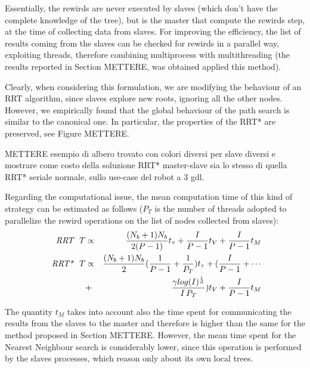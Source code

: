 Essentially, the rewirds are never executed by slaves (which don't have the complete knowledge of the tree), but is the master that compute the rewirds step, at the time of collecting data from slaves. For improving the efficiency, the list of results coming from the slaves can be checked for rewirds in a parallel way, exploiting threads, therefore combining multiprocess with multithreading (the results reported in Section METTERE, was obtained applied this method).


Clearly, when considering this formulation, we are modifying the behaviour of an RRT algorithm, since slaves explore new roots, ignoring all the other nodes. However, we empirically found that the global behaviour of the path search is similar to the canonical one. In particular, the properties of the RRT* are preserved, see Figure METTERE.

METTERE esempio di albero trovato con colori diversi per slave diversi e mostrare come costo della soluzione RRT* master-slave sia lo stesso di quella RRT* seriale normale, sullo use-case del robot 
a 3 gdl.

Regarding the computational issue, the mean computation time of this kind of strategy can be estimated as follows ($P_{T}$ is the number of threads adopted to parallelize the rewird operations on the list of nodes collected from slaves):
\begin{eqnarray}
\textit{ RRT  \,\,} T &\propto & \frac{(N_b+1)N_b}{2(P-1)} t_{\tau} 
+ \frac{I}{P-1} t_V + \frac{I}{P-1} t_M
\nonumber\\
\textit{ RRT*  \,\,} T &\propto & \frac{(N_b+1)N_b}{2}(\frac{1}{P-1} + \frac{1}{P_T}) t_{\tau} 
+ (\frac{I}{P-1} + \cdots \nonumber\\
&+& \frac{\gamma log(I)^{\frac{1}{d}}}{I\,P_{T}}) t_V + \frac{I}{P-1} t_M
\end{eqnarray}

The quantity $t_M$ takes into account also the time spent for communicating the results from the slaves to the master and therefore is higher than the same for the method proposed in Section METTERE. However, the mean time spent for the Nearest Neighbour search is considerably lower, since this operation is performed by the slaves processes, which reason only about its own local trees. 
